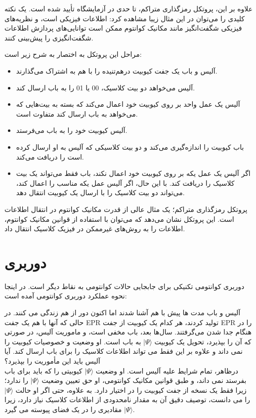 \documentclass{book}
\begin{document}
علاوه بر این، پروتکل رمزگذاری متراکم، تا حدی در آزمایشگاه تأیید شده است.  یک نکته کلیدی را می‌توان در این مثال زیبا مشاهده کرد: اطلاعات فیزیکی است، و نظریه‌های فیزیکی شگفت‌انگیز مانند مکانیک کوانتوم ممکن است توانایی‌های پردازش اطلاعات شگفت‌انگیزی را پیش‌بینی کنند.

مراحل این پروتکل به اختصار به شرح زیر است:\\

\begin{itemize}
	\item آلیس و باب یک جفت کیوبیت درهم‌تنیده را با هم به اشتراک می‌گذارند.
	\item آلیس می‌خواهد دو بیت کلاسیک، 00 یا 01 را به باب ارسال کند.
	\item آلیس یک عمل واحد بر روی کیوبیت خود اعمال می‌کند که بسته به بیت‌هایی که می‌خواهد به باب ارسال کند متفاوت است.
	\item آلیس کیوبیت خود را به باب می‌فرستد.
	\item باب کیوبیت را اندازه‌گیری می‌کند و دو بیت کلاسیکی که آلیس به او ارسال کرده است را دریافت می‌کند.
	\item اگر آلیس یک عمل یکه بر روی کیوبیت خود اعمال نکند، باب فقط می‌تواند یک بیت کلاسیک را دریافت کند. با این حال، اگر آلیس عمل یکه مناسب را اعمال کند، می‌تواند دو بیت کلاسیک را با ارسال یک کیوبیت انتقال دهد.
\end{itemize}

پروتکل رمزگذاری متراکم؛ یک مثال عالی از قدرت مکانیک کوانتوم در انتقال اطلاعات است. این پروتکل نشان می‌دهد که می‌توان با استفاده از قوانین مکانیک کوانتوم، اطلاعات را به روش‌های غیرممکن در فیزیک کلاسیک انتقال داد.
\newpage
\section{دوربری}
دوربری کوانتومی تکنیکی برای جابجایی حالات کوانتومی به نقاط دیگر است. در اینجا نحوه عملکرد دوربری کوانتومی آمده است:

 آلیس و باب مدت ها پیش با هم آشنا شدند اما اکنون دور از هم زندگی می کنند. در حالی که آنها با هم یک جفت EPR تولید کردند، هر کدام یک کیوبیت از جفت EPR را در هنگام جدا شدن می‌گرفتند. سال‌ها بعد، باب مخفی است، و ماموریت آلیس، در صورتی که آن را بپذیرد، تحویل یک کیوبیت $\vert \Psi \rangle$ به باب است. او وضعیت  و خصوصیات کیوبیت را نمی داند و علاوه بر این فقط می تواند اطلاعات کلاسیک را برای باب ارسال کند. آیا آلیس باید این مأموریت را بپذیرد؟\\


درظاهر، تمام شرایط علیه آلیس است. او وضعیت $\vert \Psi \rangle$ کیوبیتی را که باید برای باب بفرستد نمی داند، و طبق قوانین مکانیک کوانتومی، او حق تعیین وضعیت $\vert \Psi \rangle$ را ندارد؛‌زیرا فقط یک نسخه از جفت کیوبیت را در اختیار دارد. به علاوه، حتی اگر او حالت $\vert \Psi \rangle$ را می دانست، توصیف دقیق آن به مقدار نامحدودی از اطلاعات کلاسیک نیاز دارد، زیرا $\vert \Psi \rangle$ مقادیری را در یک فضای پیوسته می گیرد.
\end{document}
